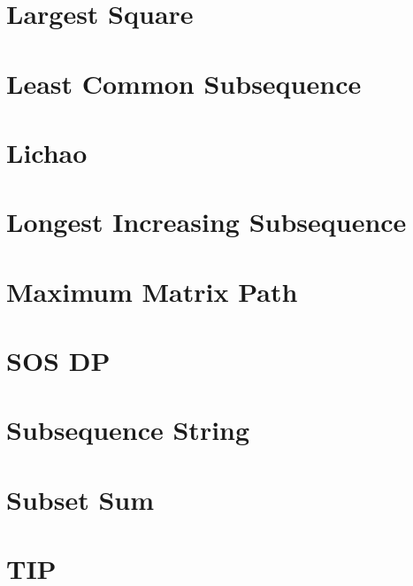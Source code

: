 

\section{Largest Square}




\section{Least Common Subsequence}




\section{Lichao}



\section{Longest Increasing Subsequence}



\section{Maximum Matrix Path}



\section{SOS DP}




\section{Subsequence String}



\section{Subset Sum}



\section{TIP}


